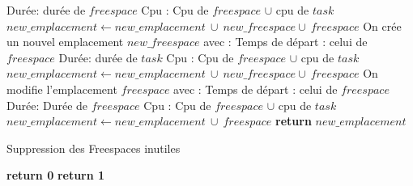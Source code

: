 \documentclass{report}
\begin{document}
\begin{algorithm}[h]
\begin{algorithmic}[1]
					\State \hspace{\algorithmicindent} Durée: durée de $freespace$
					\State \hspace{\algorithmicindent} Cpu : Cpu de $freespace$ $\cup$ cpu de $task$
				\State $new\_emplacement \gets new\_emplacement\ \cup\ new\_freespace \cup\ freespace$
				\State On crée un nouvel emplacement $new\_freespace$ avec :
					\State \hspace{\algorithmicindent} Temps de départ : celui de $freespace$
					\State \hspace{\algorithmicindent} Durée: durée de $task$
					\State \hspace{\algorithmicindent} Cpu : Cpu de $freespace$ $\cup$ cpu de $task$
				\State $new\_emplacement \gets new\_emplacement\ \cup\ new\_freespace \cup\ freespace$
			\Else
				\State On modifie l'emplacement $freespace$ avec :
			\State \hspace{\algorithmicindent} Temps de départ : celui de $freespace$
			\State \hspace{\algorithmicindent} Durée: Durée de $freespace$
			\State \hspace{\algorithmicindent} Cpu : Cpu de $freespace$ $\cup$ cpu de $task$
				\State $new\_emplacement \gets new\_emplacement\ \cup\ freespace$	
			\EndIf
		\EndIf
	\EndIf
	\State
	\State \textbf{return} $new\_emplacement$
\EndFunction
\end{algorithmic}
\end{algorithm}

\begin{algorithm}
\caption{Suppression des Freespaces inutiles}\label{is_necessary_freespace}
\begin{algorithmic}[1]
	\State
					\State \textbf{return 0}
				\EndIf
			\EndIf
		\EndIf
	\EndFor
	\State \textbf{return 1}
\EndFunction
\end{algorithmic}
\end{algorithm}
\end{document}
